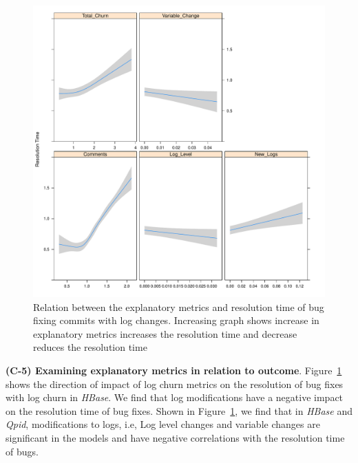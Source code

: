 \begin{figure}[t]
	\begin{minipage}{1\columnwidth}
		\centering
		
		\includegraphics[width=.69\textwidth]{HbaseDirectionPlot}	
	\end{minipage}
	\hspace*{1.cm}\caption{Relation between the explanatory metrics and resolution time of bug fixing commits with log changes. Increasing graph shows increase in explanatory metrics increases the resolution time and decrease reduces the resolution time \label{fig:HbaseDirectionPlot}}
\end{figure}






\textbf{(C-5) Examining explanatory metrics in relation to outcome}. Figure~\ref{fig:HbaseDirectionPlot} shows the direction of impact of log churn metrics on the resolution of bug fixes with log churn in \emph{HBase}. We find that log modifications have a negative impact on the resolution time of bug fixes. Shown in Figure~\ref{fig:HbaseDirectionPlot}, we find that in \emph{HBase} and \emph{Qpid}, modifications to logs, i.e, Log level changes and variable changes are significant in the models and have negative correlations with the resolution time of bugs. 

